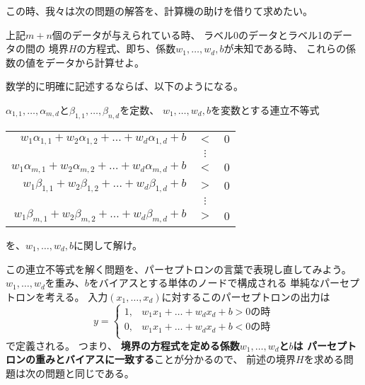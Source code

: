 この時、我々は次の問題の解答を、計算機の助けを借りて求めたい。

\begin{screen}
  上記$m + n$個のデータが与えられている時、
  ラベル0のデータとラベル1のデータの間の
  境界$H$の方程式、即ち、係数$w_1, \dots, w_d, b$が未知である時、
  これらの係数の値をデータから計算せよ。
\end{screen}

数学的に明確に記述するならば、以下のようになる。

\begin{screen}
  $\alpha_{1,1}, \dots, \alpha_{m,d}$と$\beta_{1,1}, \dots, \beta_{n,d}$を定数、
  $w_1, \dots, w_d, b$を変数とする連立不等式
  \begin{center}
    \begin{tabular}{rcl}
      $w_1\alpha_{1,1} + w_2\alpha_{1,2} + \dots + w_d\alpha_{1,d} + b$ & $<$ & $0$
      \\
                                                                        & $\vdots$
      \\
      $w_1\alpha_{m,1} + w_2\alpha_{m,2} + \dots + w_d\alpha_{m,d} + b$ & $<$ & $0$
      \\
      $w_1\beta_{1,1} + w_2\beta_{1,2} + \dots + w_d\beta_{1,d} + b$ & $>$ & $0$
      \\
                                                                        & $\vdots$
      \\
      $w_1\beta_{m,1} + w_2\beta_{m,2} + \dots + w_d\beta_{m,d} + b$ & $>$ & $0$
    \end{tabular}
  \end{center}
  を、$w_1, \dots, w_d, b$に関して解け。
\end{screen}

この連立不等式を解く問題を、パーセプトロンの言葉で表現し直してみよう。
$w_1, \dots, w_d$を重み、$b$をバイアスとする単体のノードで構成される
単純なパーセプトロンを考える。
入力$(x_1, \dots, x_d)$に対するこのパーセプトロンの出力は
\[
  y = 
  \begin{cases}
    1, & \text{$w_1x_1 + \dots + w_dx_d + b > 0$の時}\\
    0, & \text{$w_1x_1 + \dots + w_dx_d + b < 0$の時}\\
  \end{cases}
\]
で定義される。
つまり、
\textbf{境界の方程式を定める係数$w_1, \dots, w_d$と$b$は
  パーセプトロンの重みとバイアスに一致する}ことが分かるので、
前述の境界$H$を求める問題は次の問題と同じである。


